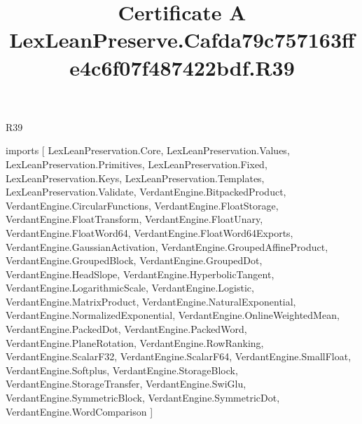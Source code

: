 \begin{lexlean}{R39}
\title{Certificate A LexLeanPreserve.Cafda79c757163ffe4c6f07f487422bdf.R39}
\begin{coremodule}
imports [
  LexLeanPreservation.Core,
  LexLeanPreservation.Values,
  LexLeanPreservation.Primitives,
  LexLeanPreservation.Fixed,
  LexLeanPreservation.Keys,
  LexLeanPreservation.Templates,
  LexLeanPreservation.Validate,
  VerdantEngine.BitpackedProduct,
  VerdantEngine.CircularFunctions,
  VerdantEngine.FloatStorage,
  VerdantEngine.FloatTransform,
  VerdantEngine.FloatUnary,
  VerdantEngine.FloatWord64,
  VerdantEngine.FloatWord64Exports,
  VerdantEngine.GaussianActivation,
  VerdantEngine.GroupedAffineProduct,
  VerdantEngine.GroupedBlock,
  VerdantEngine.GroupedDot,
  VerdantEngine.HeadSlope,
  VerdantEngine.HyperbolicTangent,
  VerdantEngine.LogarithmicScale,
  VerdantEngine.Logistic,
  VerdantEngine.MatrixProduct,
  VerdantEngine.NaturalExponential,
  VerdantEngine.NormalizedExponential,
  VerdantEngine.OnlineWeightedMean,
  VerdantEngine.PackedDot,
  VerdantEngine.PackedWord,
  VerdantEngine.PlaneRotation,
  VerdantEngine.RowRanking,
  VerdantEngine.ScalarF32,
  VerdantEngine.ScalarF64,
  VerdantEngine.SmallFloat,
  VerdantEngine.Softplus,
  VerdantEngine.StorageBlock,
  VerdantEngine.StorageTransfer,
  VerdantEngine.SwiGlu,
  VerdantEngine.SymmetricBlock,
  VerdantEngine.SymmetricDot,
  VerdantEngine.WordComparison
]


\end{coremodule}
\end{lexlean}
